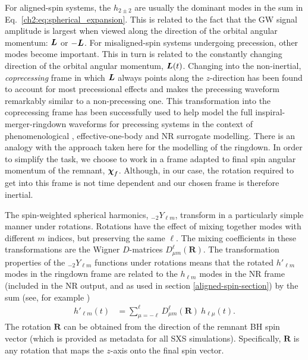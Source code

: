 For aligned-spin systems, the $h_{2\pm2}$ are usually the dominant modes in the sum in Eq.~\ref{ch2:eq:spherical_expansion}. This is related to the fact that the GW signal amplitude is largest when viewed along the direction of the orbital angular momentum: $\vb*{L}$ or $-\vb*{L}$. For misaligned-spin systems undergoing precession, other modes become important. This in turn is related to the constantly changing direction of the orbital angular momentum, $\vb*{L}(t)$.
Changing into the non-inertial, \emph{coprecessing} frame in which $\vb*{L}$ always points along the $z$-direction has been found to account for most precessional effects and makes the precessing waveform remarkably similar to a non-precessing one.
This transformation into the coprecessing frame has been successfully used to help model the full inspiral-merger-ringdown waveforms for precessing systems \cite{Schmidt:2010it,Schmidt:2012rh} in the context of phenomenological \cite{Hannam:2013oca, Khan:2018fmp, Pratten:2020ceb}, effective-one-body \cite{Pan:2013rra, Ossokine:2020kjp} and NR surrogate \cite{Blackman:2017dfb, Blackman:2017pcm, Varma:2019csw} modelling.
There is an analogy with the approach taken here for the modelling of the ringdown. In order to simplify the task, we choose to work in a frame adapted to final spin angular momentum of the remnant, $\vb*{\chi}_f$.
Although, in our case, the rotation required to get into this frame is not time dependent and our chosen frame is therefore inertial.

The spin-weighted spherical harmonics, ${}_{-2}Y_{\ell m}$, transform in a particularly simple manner under rotations.
Rotations have the effect of mixing together modes with different $m$ indices, but preserving the same $\ell$. 
The mixing coefficients in these transformations are the Wigner $D$-matrices $D^{\ell}_{\mu m} (\mathbf{R})$.
The transformation properties of the ${}_{-2}Y_{\ell m}$ functions under rotations means that the rotated $h'_{\ell m}$ modes in the ringdown frame are related to the $h_{\ell m}$ modes in the NR frame (included in the NR output, and as used in section \ref{aligned-spin-section}) by the sum (see, for example \cite{Boyle:2013nka, Schmidt:2010it, OShaughnessy:2011pmr})
\begin{align}\label{Yrotation_wignerD}
    h'_{\ell m}(t) &= \sum_{\mu = -\ell}^{\ell} D^{\ell}_{\mu m} (\mathbf{R}) ~ h_{\ell \mu}(t).
\end{align}
The rotation $\mathbf{R}$ can be obtained from the direction of the remnant BH spin vector (which is provided as metadata for all SXS simulations). Specifically, $\mathbf{R}$ is any rotation that maps the $z$-axis onto the final spin vector.

